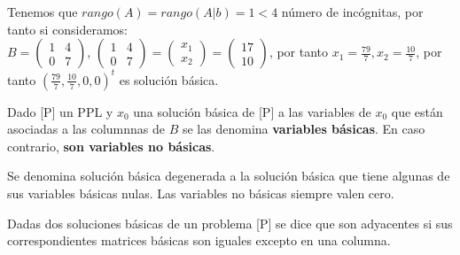\documentclass[11pt,fleqn]{book} %
\begin{document}
Tenemos que $rango(A)=rango(A | b)=1<4$ número de incógnitas, por tanto si consideramos: \\
$B=\left(\begin{array}{cc}
  1&4\\
  0&7
\end{array}\right)$, $\left(\begin{array}{cc}
  1&4\\
  0&7
\end{array}\right)=\left(\begin{array}{c}
  x_1 \\
  x_2
\end{array}\right)=\left(\begin{array}{c}
  17 \\ 10
\end{array}\right)$, por tanto $x_1=\frac{79}{7}, x_2=\frac{10}{7}$, por tanto $(\frac{79}{7}, \frac{10}{7},0,0)^t$ es solución básica. \\
\begin{definition}
  Dado [P] un PPL y $x_0$ una solución básica de [P] a las variables de $x_0$ que están asociadas a las columnnas de $B$ se las denomina \textbf{variables básicas}. En caso contrario, \textbf{son variables no básicas}.
\end{definition}
\begin{definition}
  Se denomina solución básica degenerada a la solución básica que tiene algunas de sus variables básicas nulas. Las variables no básicas siempre valen cero.
\end{definition}
\begin{definition}
  Dadas dos soluciones básicas de un problema [P] se dice que son adyacentes si sus correspondientes matrices básicas son iguales excepto en una columna.
\end{definition}
\end{document}
